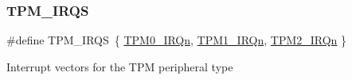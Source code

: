 \subsubsection{\texorpdfstring{TPM\_IRQS}{TPM\_IRQS}}
{\footnotesize\ttfamily \#define T\+P\+M\+\_\+\+I\+R\+QS~\{ \mbox{\hyperlink{group___interrupt__vector__numbers_gga666eb0caeb12ec0e281415592ae89083a8272b49ef18300d267156bac2c81f9c7}{T\+P\+M0\+\_\+\+I\+R\+Qn}}, \mbox{\hyperlink{group___interrupt__vector__numbers_gga666eb0caeb12ec0e281415592ae89083a2d109efab0332c2f73d46d5ed65995a8}{T\+P\+M1\+\_\+\+I\+R\+Qn}}, \mbox{\hyperlink{group___interrupt__vector__numbers_gga666eb0caeb12ec0e281415592ae89083aaf0e306be85f7d3cce57dbbba5e648cf}{T\+P\+M2\+\_\+\+I\+R\+Qn}} \}}

Interrupt vectors for the T\+PM peripheral type 